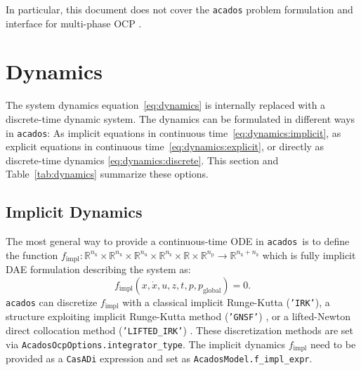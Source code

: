 \documentclass[english]{article}
\newcommand{\code}[1]{\texttt{#1}}
\newcommand{\casadi}{\texttt{CasADi}}
\newcommand{\acados}{\texttt{acados}}
\newcommand{\matlab}{\textsc{Matlab}}
\newcommand{\ind}[1]{_{\textrm{#1}}}
\newcommand{\glob}{_{\textrm{global}}}
\newcommand{\nx}{n\ind{x}}
\newcommand{\nuu}{n\ind{u}}
\newcommand{\nz}{n\ind{z}}
\newcommand{\np}{n\ind{p}}
\begin{document}
In particular, this document does not cover the \acados{} problem formulation and interface for multi-phase OCP \cite{frey2024multi}.




\section{Dynamics}\label{sec:dynamics}
%
%
The system dynamics equation~\eqref{eq:dynamics} is internally replaced with a discrete-time dynamic system.
The dynamics can be formulated in different ways in \acados:
As implicit equations in continuous time~\eqref{eq:dynamics:implicit}, as explicit equations in continuous time~\eqref{eq:dynamics:explicit}, or directly as discrete-time dynamics \eqref{eq:dynamics:discrete}.
This section and Table~\ref{tab:dynamics} summarize these options.
%
\subsection{Implicit Dynamics}\label{sec:dynamics:implicit}
%
The most general way to provide a continuous-time ODE in \acados\ is to define the function $ f\ind{impl}: \mathbb{R}^{\nx}\times\mathbb{R}^{\nx}\times\mathbb{R}^{\nuu}\times\mathbb{R}^{\nz}\times\mathbb{R} \times \mathbb{R}^{\np} \rightarrow \mathbb{R}^{\nx+\nz}$ which is fully implicit DAE formulation describing the system as:
\begin{equation}
    f\ind{impl}(x, \dot{x}, u, z, t, p, p\glob) = 0.\label{eq:dynamics:implicit}
\end{equation}
\acados{} can discretize $ f\ind{impl} $ with a classical implicit Runge-Kutta (\code{'IRK'}), a structure exploiting implicit Runge-Kutta method (\code{'GNSF'}) \cite{Frey2019}, or a lifted-Newton direct collocation method (\code{'LIFTED\_IRK'}) \cite{Quirynen2015a}.
These discretization methods are set via \code{AcadosOcpOptions.integrator\_type}.
The implicit dynamics $f\ind{impl}$ need to be provided as a \casadi{} expression and set as \code{AcadosModel.f\_impl\_expr}.
\end{document}
